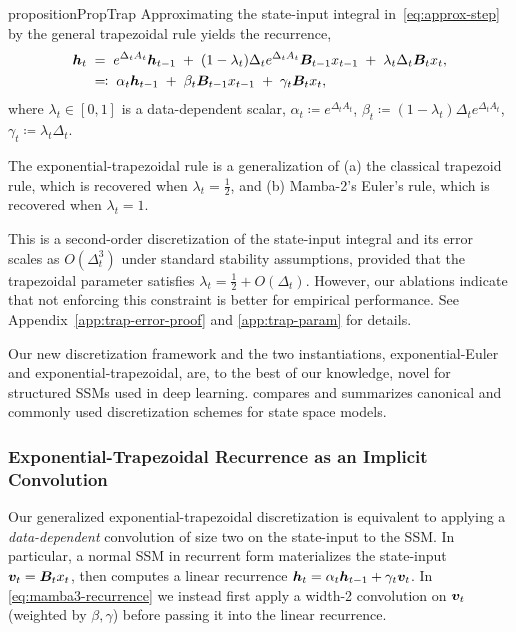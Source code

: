 \begin{restatable}{proposition}{PropTrap}\label{prop:trap}
Approximating the state-input integral in~\eqref{eq:approx-step} by the general trapezoidal rule yields the recurrence,
\begin{align}
    {\bm{h}}_t 
    \;&=\; 
    e^{\Delta_t A_t} {\bm{h}}_{t-1} 
    \;+\; (1-\lambda_t)\Delta_t e^{\Delta_t A_t} {\bm{B}}_{t-1} x_{t-1} 
    \;+\; \lambda_t \Delta_t {\bm{B}}_t x_t,
    \\
    &\eqqcolon\; 
    \alpha_t {\bm{h}}_{t-1} 
    \;+\; \beta_t {\bm{B}}_{t-1} x_{t-1} 
    \;+\; \gamma_t {\bm{B}}_t x_t,
    \label{eq:mamba3-recurrence}
\end{align}
where $\lambda_t \in [0,1]$ is a data-dependent scalar, $\alpha_t \coloneqq e^{\Delta_t A_t}$, $\beta_t \coloneqq (1-\lambda_t)\Delta_t e^{\Delta_t A_t}$, $\gamma_t \coloneqq \lambda_t \Delta_t$.

\end{restatable}
\begin{remark}[Expressivity]
    The exponential-trapezoidal rule is a generalization of (a) the classical trapezoid rule, which is recovered when $\lambda_t = \tfrac{1}{2}$, and (b) Mamba-2's Euler's rule, which is recovered when $\lambda_t = 1$.
\end{remark}
\begin{remark} 
    This is a second-order discretization of the state-input integral and its error scales as $O(\Delta_t^3)$ 
    under standard stability assumptions, provided that the trapezoidal parameter satisfies $\lambda_t = \tfrac{1}{2} + O(\Delta_t)$.
    However, our ablations indicate that not enforcing this constraint is better for empirical performance. See Appendix~\ref{app:trap-error-proof} and \ref{app:trap-param} for details.
\end{remark}

Our new discretization framework and the two instantiations, exponential-Euler and exponential-trapezoidal, are, to the best of our knowledge, novel for structured SSMs used in deep learning.
 compares and summarizes canonical and commonly used discretization schemes for state space models.

\subsubsection{Exponential-Trapezoidal Recurrence as an Implicit Convolution}

Our generalized exponential-trapezoidal discretization is equivalent to applying a \emph{data-dependent} convolution of size two on the state-input to the SSM.
In particular, a normal SSM in recurrent form materializes the state-input ${\bm{v}}_t = {\bm{B}}_tx_t$, then computes a linear recurrence ${\bm{h}}_t = \alpha_t {\bm{h}}_{t-1} + \gamma_t {\bm{v}}_t$. In \eqref{eq:mamba3-recurrence} we instead first apply a width-2 convolution on ${\bm{v}}_t$ (weighted by $\beta, \gamma$) before passing it into the linear recurrence.

